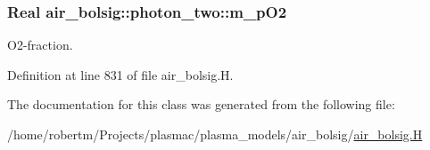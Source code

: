 \subsubsection[{\texorpdfstring{m\+\_\+p\+O2}{m_pO2}}]{\setlength{\rightskip}{0pt plus 5cm}Real air\+\_\+bolsig\+::photon\+\_\+two\+::m\+\_\+p\+O2\hspace{0.3cm}{\ttfamily [protected]}}\hypertarget{classair__bolsig_1_1photon__two_aa5b04dc43f6408423a136c0ea7fbff77}{}\label{classair__bolsig_1_1photon__two_aa5b04dc43f6408423a136c0ea7fbff77}


O2-\/fraction. 



Definition at line 831 of file air\+\_\+bolsig.\+H.



The documentation for this class was generated from the following file\+:\begin{DoxyCompactItemize}
\item 
/home/robertm/\+Projects/plasmac/plasma\+\_\+models/air\+\_\+bolsig/\hyperlink{air__bolsig_8H}{air\+\_\+bolsig.\+H}\end{DoxyCompactItemize}
